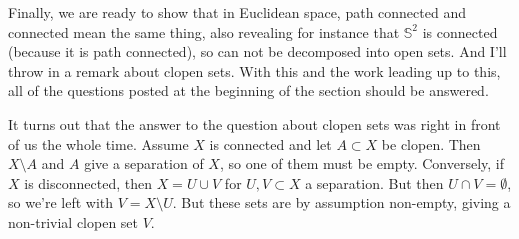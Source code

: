 Finally, we are ready to show that in Euclidean space, path connected and connected mean the same thing, also revealing for instance that $\mathbb{S}^{2}$ is connected (because it is path connected), so can not be decomposed into open sets. And I'll throw in a remark about clopen sets. With this and the work leading up to this, all of the questions posted at the beginning of the section should be answered.

\begin{remark}\label{rem:clopen_iff_connected}
	It turns out that the answer to the question about clopen sets was right in front of us the whole time. Assume $X$ is connected and let $A \subset X$ be clopen. Then $X \setminus A$ and $A$ give a separation of $X$, so one of them must be empty. Conversely, if $X$ is disconnected, then $X = U \cup V$ for $U, V \subset X$ a separation. But then $U \cap V = \emptyset$, so we're left with $V = X \setminus U$. But these sets are by assumption non-empty, giving a non-trivial clopen set $V$.
\end{remark}

